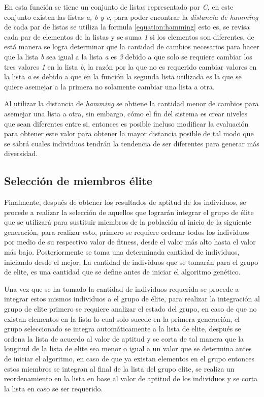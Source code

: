 En esta función se tiene un conjunto de listas representado por \textit{C}, en
este conjunto existen las listas \textit{a, b y c}, para poder encontrar la
\textit{distancia de hamming} de cada par de listas se utiliza la formula
\ref{equation:hamming} esto es, se revisa cada par de elementos de la listas y
se suma \textit{1} si los elementos son diferentes, de está manera se logra
determinar que la cantidad de cambios necesarios para hacer que la lista
\textit{b} sea igual a la lista \textit{a} es \textit{3} debido a
que solo se requiere cambiar los tres valores \textit{1} en la lista \textit{b},
la razón por la que no es requerido cambiar valores en la lista \textit{a} es
debido a que en la función la segunda lista utilizada es la que se quiere
asemejar a la primera no solamente cambiar una lista a otra.

Al utilizar la distancia de \textit{hamming} se obtiene 
la cantidad menor de cambios para asemejar una lista a otra, sin
embargo, cómo el fin del sistema es crear niveles que sean diferentes entre si,
entonces es posible incluso modificar la evaluación para obtener este valor para
obtener la mayor distancia posible de tal modo que se sabrá cuales individuos
tendrán la tendencia de ser diferentes para generar más diversidad.

\subsection{Selección de miembros élite}
\label{subsection:elite_selection}

Finalmente, después de obtener los resultados de aptitud de los individuos, se
procede a realizar la selección de aquellos que lograrán integrar el grupo de
élite que se utilizará para sustituir miembros de la población al inicio de la
siguiente generación, para realizar esto, primero se requiere ordenar todos los
individuos por medio de su respectivo valor de fitness, desde el valor más alto
hasta el valor más bajo. Posteriormente se toma una determinada cantidad de
individuos, iniciando desde el mejor. La cantidad de individuos que se tomarán
para el grupo de elite, es una cantidad que se define antes de iniciar el
algoritmo genético.

Una vez que se ha tomado la cantidad de individuos requerida se procede a
integrar estos mismos individuos a el grupo de élite, para realizar la
integración al grupo de elite primero se requiere analizar el estado del grupo,
en caso de que no existan elementos en la lista lo cual solo sucede en la
primera generación, el grupo seleccionado se integra automáticamente a la lista
de elite, después se ordena la lista de acuerdo al valor de aptitud y se corta de
tal manera que la longitud de la lista de elite sea menor o igual a un valor que
se determina antes de iniciar el algoritmo, en caso de que ya existan elementos
en el grupo entonces estos miembros se integran al final de la lista del grupo
elite, se realiza un reordenamiento en la lista en base al valor de aptitud de
los individuos y se corta la lista en caso se ser requerido.

